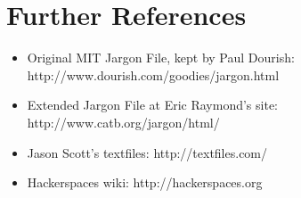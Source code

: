 \documentclass[10pt,letter,oneside]{scrartcl}
\begin{document}
\section*{Further References}

\begin{itemize}
\item  Original MIT Jargon File, kept by Paul Dourish:
  http://www.dourish.com/goodies/jargon.html 
\item  Extended Jargon File at Eric Raymond's site:
  http://www.catb.org/jargon/html/
\item Jason Scott's textfiles:
  http://textfiles.com/ 
\item Hackerspaces wiki: 
  http://hackerspaces.org
\end{itemize}

% 

\printbibliography 
\end{document}
